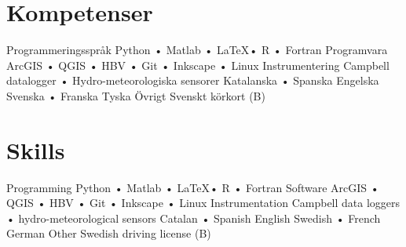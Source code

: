 \ifswedish
  \section{Kompetenser}
    \skill
      {Programmeringsspråk}
      {Python • Matlab • \LaTeX • R • Fortran}
    \skill
      {Programvara}
      {ArcGIS • QGIS • HBV • Git • Inkscape • Linux}
    \skill
      {Instrumentering}
      {Campbell datalogger • Hydro-meteorologiska sensorer}
    \languages
      {Katalanska • Spanska}
      {Engelska}
      {Svenska • Franska}
      {Tyska}
    \skill
      {Övrigt}
      {Svenskt körkort (B)}
\else
  \section{Skills}
    \skill
      {Programming}
      {Python • Matlab • \LaTeX • R • Fortran}
    \skill
      {Software}
      {ArcGIS • QGIS • HBV • Git • Inkscape • Linux}
    \skill
      {Instrumentation}
      {Campbell data loggers • hydro-meteorological sensors}
    \languages
      {Catalan • Spanish}
      {English}
      {Swedish • French}
      {German}
    \skill
      {Other}
      {Swedish driving license (B)}
\fi
